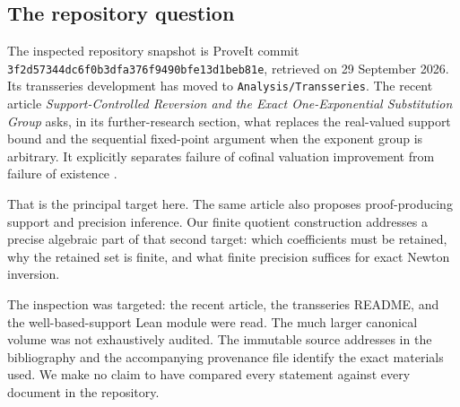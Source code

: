 \documentclass[11pt,a4paper]{article}
\theoremstyle{definition}
\theoremstyle{remark}
\newcommand{\pathcode}[1]{\nolinkurl{#1}}
\begin{document}
\subsection{The repository question}
The inspected repository snapshot is ProveIt commit
\pathcode{3f2d57344dc6f0b3dfa376f9490bfe13d1beb81e}, retrieved on
29 September 2026. Its transseries development has moved to
\pathcode{Analysis/Transseries}. The recent article
\emph{Support-Controlled Reversion and the Exact One-Exponential
Substitution Group} asks, in its further-research section, what replaces
the real-valued support bound and the sequential fixed-point argument when
the exponent group is arbitrary. It explicitly separates failure of
cofinal valuation improvement from failure of existence
\cite{RepoReversion,RepoReadme}.

That is the principal target here. The same article also proposes
proof-producing support and precision inference. Our finite quotient
construction addresses a precise algebraic part of that second target:
which coefficients must be retained, why the retained set is finite, and
what finite precision suffices for exact Newton inversion.

The inspection was targeted: the recent article, the transseries README,
and the well-based-support Lean module were read. The much larger canonical
volume was not exhaustively audited. The immutable source addresses in the
bibliography and the accompanying provenance file identify the exact
materials used. We make no claim to have compared every statement against
every document in the repository.
\end{document}
